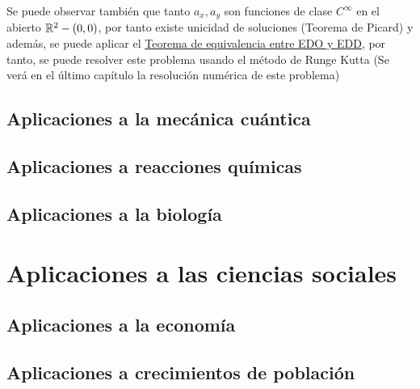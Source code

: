 \begin{ejemplo}
	Se puede observar también que tanto $a_x, a_y$ son funciones de clase $C^\infty$ en el abierto $\mathbb R^2 - (0, 0)$, por tanto existe unicidad de soluciones (Teorema de Picard) y además, se puede aplicar el \hyperref[teorema:equivalencia]{Teorema de equivalencia entre EDO y EDD}, por tanto, se puede resolver este problema usando el método de Runge Kutta (Se verá en el último capítulo la resolución numérica de este problema)
	
\end{ejemplo}

\subsection{Aplicaciones a la mecánica cuántica}

\subsection{Aplicaciones a reacciones químicas}
\subsection{Aplicaciones a la biología}

\section{Aplicaciones a las ciencias sociales}

\subsection{Aplicaciones a la economía}

\subsection{Aplicaciones a crecimientos de población}